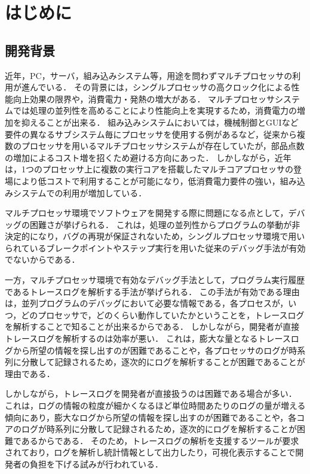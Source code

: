\chapter{はじめに}

\section{開発背景}

近年，PC，サーバ，組み込みシステム等，用途を問わずマルチプロセッサの利用が進んでいる．
その背景には，シングルプロセッサの高クロック化による性能向上効果の限界や，消費電力・発熱の増大がある．
マルチプロセッサシステムでは処理の並列性を高めることにより性能向上を実現するため，消費電力の増加を抑えることが出来る．
組み込みシステムにおいては，機械制御とGUIなど要件の異なるサブシステム毎にプロセッサを使用する例があるなど，従来から複数のプロセッサを用いるマルチプロセッサシステムが存在していたが，部品点数の増加によるコスト増を招くため避ける方向にあった．
しかしながら，近年は，1つのプロセッサ上に複数の実行コアを搭載したマルチコアプロセッサの登場により低コストで利用することが可能になり，低消費電力要件の強い，組み込みシステムでの利用が増加している．

マルチプロセッサ環境でソフトウェアを開発する際に問題になる点として，デバッグの困難さが挙げられる．
これは，処理の並列性からプログラムの挙動が非決定的になり，バグの再現が保証されないため，シングルプロセッサ環境で用いられているブレークポイントやステップ実行を用いた従来のデバッグ手法が有効でないからである．

一方，マルチプロセッサ環境で有効なデバッグ手法として，プログラム実行履歴であるトレースログを解析する手法が挙げられる．
この手法が有効である理由は，並列プログラムのデバッグにおいて必要な情報である，各プロセスが，いつ，どのプロセッサで，どのくらい動作していたかということを，トレースログを解析することで知ることが出来るからである．
しかしながら，開発者が直接トレースログを解析するのは効率が悪い．
これは，膨大な量となるトレースログから所望の情報を探し出すのが困難であることや，各プロセッサのログが時系列に分散して記録されるため，逐次的にログを解析することが困難であることが理由である．

しかしながら，トレースログを開発者が直接扱うのは困難である場合が多い．
これは，ログの情報の粒度が細かくなるほど単位時間あたりのログの量が増える傾向にあり，膨大なログから所望の情報を探し出すのが困難であることや，各コアのログが時系列に分散して記録されるため，逐次的にログを解析することが困難であるからである．
そのため，トレースログの解析を支援するツールが要求されており，ログを解析し統計情報として出力したり，可視化表示することで開発者の負担を下げる試みが行われている．

